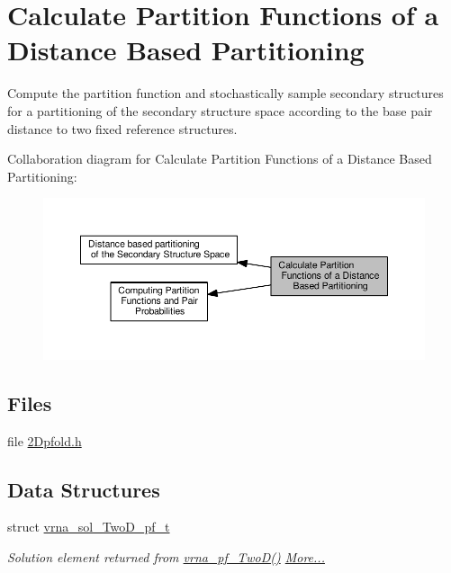 \hypertarget{group__kl__neighborhood__pf}{}\section{Calculate Partition Functions of a Distance Based Partitioning}
\label{group__kl__neighborhood__pf}


Compute the partition function and stochastically sample secondary structures for a partitioning of the secondary structure space according to the base pair distance to two fixed reference structures.  


Collaboration diagram for Calculate Partition Functions of a Distance Based Partitioning\+:
\nopagebreak
\begin{figure}[H]
\begin{center}
\leavevmode
\includegraphics[width=350pt]{group__kl__neighborhood__pf}
\end{center}
\end{figure}
\subsection*{Files}
\begin{DoxyCompactItemize}
\item 
file \hyperlink{2Dpfold_8h}{2\+Dpfold.\+h}
\end{DoxyCompactItemize}
\subsection*{Data Structures}
\begin{DoxyCompactItemize}
\item 
struct \hyperlink{group__kl__neighborhood__pf_structvrna__sol__TwoD__pf__t}{vrna\+\_\+sol\+\_\+\+Two\+D\+\_\+pf\+\_\+t}
\begin{DoxyCompactList}\small\item\em Solution element returned from \hyperlink{group__kl__neighborhood__pf_ga0bc3427689bd09da09b8b3094a27f836}{vrna\+\_\+pf\+\_\+\+Two\+D()}  \hyperlink{group__kl__neighborhood__pf_structvrna__sol__TwoD__pf__t}{More...}\end{DoxyCompactList}\end{DoxyCompactItemize}
